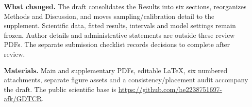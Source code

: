 \documentclass[a4paper,11pt]{article}
\begin{document}
\textbf{What changed.}
The draft consolidates the Results into six sections, reorganizes Methods and
Discussion, and moves sampling/calibration detail to the supplement.
Scientific data, fitted results, intervals and model settings remain frozen.
Author details and administrative statements are outside these review PDFs.
The separate submission checklist records decisions to complete after review.

\textbf{Materials.}
Main and supplementary PDFs, editable LaTeX, six numbered attachments,
separate figure assets and a consistency/placement audit accompany the draft.
The public scientific base is
\url{https://github.com/he2238751697-afk/GDTCR}.
\end{document}
